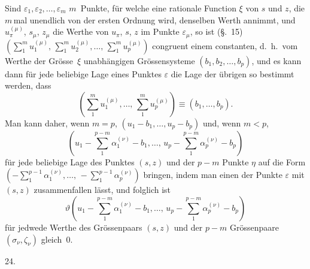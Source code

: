 \documentclass[a4paper,12pt,leqno]{article}
\begin{document}
Sind $\varepsilon_1, \varepsilon_2,\ldots, \varepsilon_m$
$m$~Punkte, f\"{u}r welche eine rationale Function $\xi$ von $s$
und $z$, die $m \,$\-mal unendlich von der ersten Ordnung wird,
denselben Werth annimmt, und $u_\pi^{(\mu)}$, $s_\mu$, $z_\mu$
die Werthe von $u_\pi$, $s$, $z$ im Punkte $\varepsilon_\mu$, so
ist (\S.~15)
$( \sum\limits_1^m u_1^{(\mu)}, \,
   \sum\limits_1^m u_2^{(\mu)},\ldots, \,
   \sum\limits_1^m u_p^{(\mu)} )$
congruent einem constanten, d.~h.\ vom Werthe der
Gr\"{o}sse~$\xi$ unabh\"{a}ngigen Gr\"{o}ssensysteme
$(b_1, b_2,\ldots, b_p)$, und es kann dann f\"{u}r jede beliebige
Lage eines Punktes $\varepsilon$ die Lage der \"{u}brigen so
bestimmt werden, dass
\[       \left(
            \sum_1^m u_1^{(\mu)},\ldots, \,
            \sum_1^m u_p^{(\mu)}
         \right)
   \equiv (b_1,\ldots, b_p).\]
Man kann daher, wenn $m = p$, $(u_1 - b_1,\ldots, u_p - b_p)$
und, wenn $m < p$,
\[    \left(
         u_1 - \sum_1^{p - m} \alpha_1^{(\nu)} - b_1,\ldots, \,
         u_p - \sum_1^{p - m} \alpha_p^{(\nu)} - b_p
      \right) \]
f\"{u}r jede beliebige Lage des Punktes $(s,z)$ und der $p - m$
Punkte $\eta$ auf die Form
$( - \sum\limits_1^{p - 1} \alpha_1^{(\nu)},\ldots, \,
   - \sum\limits_1^{p - 1} \alpha_p^{(\nu)} )$
bringen, indem man einen der Punkte $\varepsilon$ mit $(s, z)$
zusammenfallen l\"{a}sst, und folglich ist
\[ \vartheta
      \left(
         u_1 - \sum_1^{p - m} \alpha_1^{(\nu)} - b_1,\ldots, \,
         u_p - \sum_1^{p - m} \alpha_p^{(\nu)} - b_p
      \right) \]
f\"{u}r jedwede Werthe des Gr\"{o}ssenpaars $(s,z)$ und der
$p - m$ Gr\"{o}ssenpaare $(\sigma_\nu, \zeta_\nu)$ gleich~$0$.

\medbreak

\centerline{24.}

\nobreak\medskip
\end{document}
